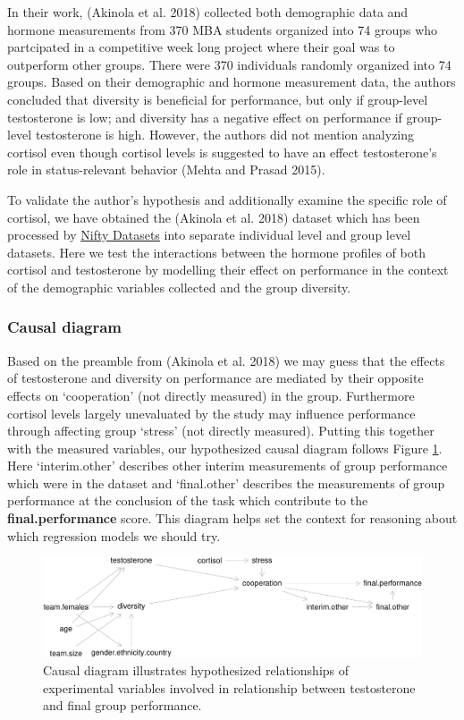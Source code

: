 \documentclass[]{article}
\begin{document}
In their work, (Akinola et al. 2018) collected both demographic data and
hormone measurements from 370 MBA students organized into 74 groups who
partcipated in a competitive week long project where their goal was to
outperform other groups. There were 370 individuals randomly organized
into 74 groups. Based on their demographic and hormone measurement data,
the authors concluded that diversity is beneficial for performance, but
only if group-level testosterone is low; and diversity has a negative
effect on performance if group-level testosterone is high. However, the
authors did not mention analyzing cortisol even though cortisol levels
is suggested to have an effect testosterone's role in status-relevant
behavior (Mehta and Prasad 2015).

To validate the author's hypothesis and additionally examine the
specific role of cortisol, we have obtained the (Akinola et al. 2018)
dataset which has been processed by
\href{http://rosmarus.refsmmat.com/datasets/datasets/hormone-diversity/}{Nifty
Datasets} into separate individual level and group level datasets. Here
we test the interactions between the hormone profiles of both cortisol
and testosterone by modelling their effect on performance in the context
of the demographic variables collected and the group diversity.

\hypertarget{causal-diagram}{%
\subsubsection{Causal diagram}\label{causal-diagram}}

Based on the preamble from (Akinola et al. 2018) we may guess that the
effects of testosterone and diversity on performance are mediated by
their opposite effects on `cooperation' (not directly measured) in the
group. Furthermore cortisol levels largely unevaluated by the study may
influence performance through affecting group `stress' (not directly
measured). Putting this together with the measured variables, our
hypothesized causal diagram follows Figure \ref{fig:cause}. Here
`interim.other' describes other interim measurements of group
performance which were in the dataset and `final.other' describes the
measurements of group performance at the conclusion of the task which
contribute to the \textbf{final.performance} score. This diagram helps
set the context for reasoning about which regression models we should
try.

\begin{figure}
\centering
\includegraphics{19_10_02_hw5_q1_files/figure-latex/causal-1.pdf}
\caption{\label{fig:cause}Causal diagram illustrates hypothesized
relationships of experimental variables involved in relationship between
testosterone and final group performance.}
\end{figure}
\end{document}
